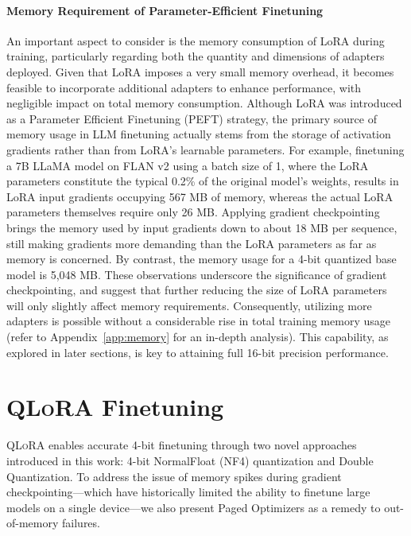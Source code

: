 \paragraph{Memory Requirement of Parameter-Efficient Finetuning} An important aspect to consider is the memory consumption of LoRA during training, particularly regarding both the quantity and dimensions of adapters deployed. Given that LoRA imposes a very small memory overhead, it becomes feasible to incorporate additional adapters to enhance performance, with negligible impact on total memory consumption. Although LoRA was introduced as a Parameter Efficient Finetuning (PEFT) strategy, the primary source of memory usage in LLM finetuning actually stems from the storage of activation gradients rather than from LoRA's learnable parameters. For example, finetuning a 7B LLaMA model on FLAN v2 using a batch size of 1, where the LoRA parameters constitute the typical 0.2\% of the original model's weights\citep{hu2021lora,liu2022few}, results in LoRA input gradients occupying 567 MB of memory, whereas the actual LoRA parameters themselves require only 26 MB. Applying gradient checkpointing~\citep{chen2016training} brings the memory used by input gradients down to about 18 MB per sequence, still making gradients more demanding than the LoRA parameters as far as memory is concerned. By contrast, the memory usage for a 4-bit quantized base model is 5,048 MB. These observations underscore the significance of gradient checkpointing, and suggest that further reducing the size of LoRA parameters will only slightly affect memory requirements. Consequently, utilizing more adapters is possible without a considerable rise in total training memory usage (refer to Appendix~\ref{app:memory} for an in-depth analysis). This capability, as explored in later sections, is key to attaining full 16-bit precision performance.

\section{\textsc{QLoRA} Finetuning}

\textsc{QLoRA} enables accurate 4-bit finetuning through two novel approaches introduced in this work: 4-bit NormalFloat (NF4) quantization and Double Quantization. To address the issue of memory spikes during gradient checkpointing—which have historically limited the ability to finetune large models on a single device—we also present Paged Optimizers as a remedy to out-of-memory failures.

